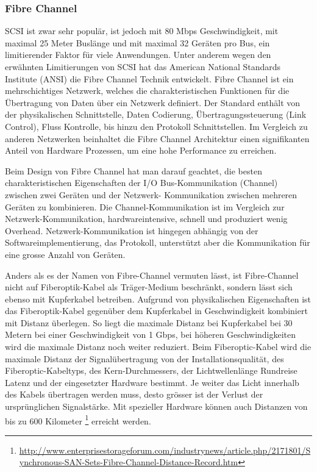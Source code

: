 \subsubsection{Fibre Channel}
SCSI ist zwar sehr populär, ist jedoch mit 80 Mbps Geschwindigkeit, mit maximal 25 Meter Buslänge und mit maximal 32 Geräten pro Bus, ein limitierender Faktor für viele Anwendungen. Unter anderem wegen den erwähnten Limitierungen von SCSI hat das American National Standards Institute (ANSI) die Fibre Channel Technik entwickelt. Fibre Channel ist ein mehrschichtiges Netzwerk, welches die charakteristischen Funktionen für die Übertragung von Daten über ein Netzwerk definiert. Der Standard enthält von der physikalischen Schnittstelle, Daten Codierung, Übertragungssteuerung (Link Control), Fluss Kontrolle, bis hinzu den Protokoll Schnittstellen. Im Vergleich zu anderen Netzwerken beinhaltet die Fibre Channel Architektur einen signifikanten Anteil von Hardware Prozessen, um eine hohe Performance zu erreichen. \cite{Gupta2002}\cite{Christopher2009}

Beim Design von Fibre Channel hat man darauf geachtet, die besten charakteristischen Eigenschaften der I/O Bus-Kommunikation (Channel) zwischen zwei Geräten und der Netzwerk- Kommunikation zwischen mehreren Geräten zu kombinieren. Die Channel-Kommunikation ist im Vergleich zur Netzwerk-Kommunikation, hardwareintensive, schnell und produziert wenig Overhead. Netzwerk-Kommunikation ist hingegen abhängig von der Softwareimplementierung, das Protokoll, unterstützt aber die Kommunikation für eine grosse Anzahl von Geräten.

Anders als es der Namen von Fibre-Channel vermuten lässt, ist Fibre-Channel nicht auf Fiberoptik-Kabel als Träger-Medium beschränkt, sondern lässt sich ebenso mit Kupferkabel betreiben. Aufgrund von physikalischen Eigenschaften ist das Fiberoptik-Kabel gegenüber dem Kupferkabel in Geschwindigkeit kombiniert mit Distanz überlegen. So liegt die maximale Distanz bei Kupferkabel bei 30 Metern bei einer Geschwindigkeit von 1 Gbps, bei höheren Geschwindigkeiten wird die maximale Distanz noch weiter reduziert. Beim Fiberoptic-Kabel wird die maximale Distanz der Signalübertragung von der Installationsqualität, des Fiberoptic-Kabeltyps, des Kern-Durchmessers, der Lichtwellenlänge Rundreise Latenz und der eingesetzter Hardware bestimmt. Je weiter das Licht innerhalb des Kabels übertragen werden muss, desto grösser ist der Verlust der ursprünglichen Signalstärke. Mit spezieller Hardware können auch Distanzen von bis zu 600 Kilometer \footnote{\url{http://www.enterprisestorageforum.com/industrynews/article.php/2171801/Synchronous-SAN-Sets-Fibre-Channel-Distance-Record.htm}} erreicht werden.

